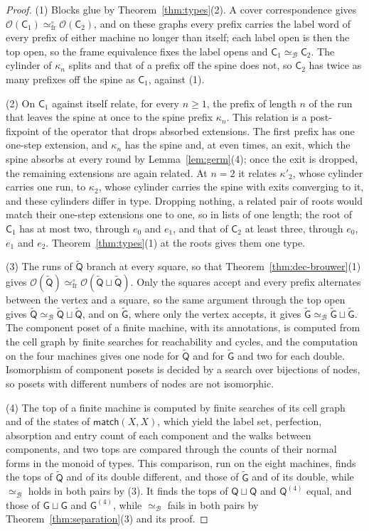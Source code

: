 \documentclass{lmcs}
\theoremstyle{definition}
\theoremstyle{remark}
\newcommand{\Op}{\mathcal{O}}
\newcommand{\eqFrF}{\simeq^{\circ}_{\mathrm{fr}}}
\providecommand{\dsum}{\sqcup}
\providecommand{\matchB}{\mathsf{match}}
\providecommand{\wQ}{\mathsf{Q}}
\providecommand{\eqB}{\simeq_{\mathcal{B}}}
\providecommand{\dsum}{\sqcup}
\providecommand{\wG}{\mathsf{G}}
\providecommand{\wGt}{\tilde{\mathsf{G}}}
\providecommand{\wQ}{\mathsf{Q}}
\providecommand{\wQt}{\tilde{\mathsf{Q}}}
\providecommand{\wC}[1]{\mathsf{C}_{#1}}
\begin{document}
\begin{proof}
(1) Blocks glue by Theorem~\ref{thm:types}(2). A cover correspondence gives $\Op(\wC{1})\eqFrF\Op(\wC{2})$, and on
these graphs every prefix carries the label word of every prefix of either machine no longer than
itself; each label open is then the top open, so the frame
equivalence fixes the label opens and $\wC{1}\eqB\wC{2}$. The cylinder of $\kappa_n$ splits and that of a prefix off the spine does not, so $\wC{2}$
has twice as many prefixes off the spine as $\wC{1}$, against (1).

(2) On $\wC{1}$ against itself relate, for every $n\geq1$, the prefix of length $n$ of the run that leaves the spine
at once to the spine prefix $\kappa_n$. This relation is a post-fixpoint of the operator that
drops absorbed extensions. The first prefix has one one-step extension, and $\kappa_n$ has the spine and, at even
times, an exit, which the spine absorbs at every round by Lemma~\ref{lem:germ}(4); once the exit is dropped, the
remaining extensions are again related. At $n=2$ it relates $\kappa'_2$, whose cylinder carries one run, to $\kappa_2$, whose cylinder
carries the spine with exits converging to it, and these cylinders differ in type.
Dropping nothing, a related pair of roots would match their one-step extensions one to one, so in lists of one
length; the root of $\wC{1}$ has at most two, through $e_0$ and $e_1$, and that of
$\wC{2}$ at least three, through $e_0$, $e_1$ and $e_2$. Theorem~\ref{thm:types}(1) at the roots gives them one
type.

(3) The runs of $\wQt$ branch at every square, so that Theorem~\ref{thm:dec-brouwer}(1) gives
$\Op(\wQt)\eqFrF\Op(\wQt\dsum\wQt)$. Only the squares accept and every prefix alternates between the vertex and a
square, so the same argument through the top open gives $\wQt\eqB\wQt\dsum\wQt$, and
on $\wGt$, where only the vertex accepts, it gives $\wGt\eqB\wGt\dsum\wGt$. The component
poset of a finite machine, with its annotations, is computed from the cell graph by finite searches for reachability
and cycles, and the computation on the four machines gives one node for $\wQt$ and
for $\wGt$ and two for each double. Isomorphism of component posets
is decided by a search over bijections of nodes, so posets with different numbers of
nodes are not isomorphic.

(4) The top of a finite machine is computed by finite searches of its cell graph and of the states of $\matchB(X,X)$,
which yield the label set, perfection, absorption and entry count of each component and the walks between
components, and two tops are
compared through the counts of their normal forms in the monoid of types. This comparison, run on the eight machines, finds the tops of $\wQt$ and of its double
different, and those of $\wGt$ and of its double, while $\eqB$ holds in both pairs by (3).
It finds the tops of $\wQ\dsum\wQ$ and $\wQ^{(4)}$ equal, and those of $\wG\dsum\wG$ and
$\wG^{(4)}$, while $\eqB$ fails in both pairs by Theorem~\ref{thm:separation}(3) and its
proof.
\end{proof}
\end{document}

